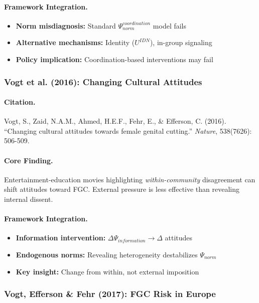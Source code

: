 \paragraph{Framework Integration.}
\begin{itemize}
  \item \textbf{Norm misdiagnosis:} Standard $\Psi_{norm}^{coordination}$ model fails
  \item \textbf{Alternative mechanisms:} Identity ($U^{IDN}$), in-group signaling
  \item \textbf{Policy implication:} Coordination-based interventions may fail
\end{itemize}

\subsubsection{Vogt et al. (2016): Changing Cultural Attitudes}

\paragraph{Citation.}
Vogt, S., Zaid, N.A.M., Ahmed, H.E.F., Fehr, E., \& Efferson, C. (2016).
``Changing cultural attitudes towards female genital cutting.''
\emph{Nature}, 538(7626): 506-509.

\paragraph{Core Finding.}
Entertainment-education movies highlighting \emph{within-community}
disagreement can shift attitudes toward FGC. External pressure is
less effective than revealing internal dissent.

\paragraph{Framework Integration.}
\begin{itemize}
  \item \textbf{Information intervention:} $\Delta\Psi_{information} \to \Delta$ attitudes
  \item \textbf{Endogenous norms:} Revealing heterogeneity destabilizes $\Psi_{norm}$
  \item \textbf{Key insight:} Change from within, not external imposition
\end{itemize}

\subsubsection{Vogt, Efferson \& Fehr (2017): FGC Risk in Europe}

